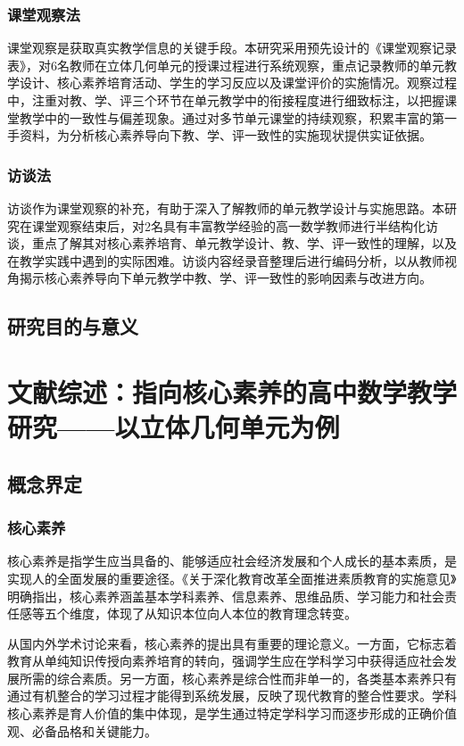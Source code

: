 \documentclass[UTF8,a4paper,12pt,twoside]{ctexart}
\begin{document}
\subsubsection{课堂观察法}
课堂观察是获取真实教学信息的关键手段。本研究采用预先设计的《课堂观察记录表》，对6名教师在立体几何单元的授课过程进行系统观察，重点记录教师的单元教学设计、核心素养培育活动、学生的学习反应以及课堂评价的实施情况。观察过程中，注重对教、学、评三个环节在单元教学中的衔接程度进行细致标注，以把握课堂教学中的一致性与偏差现象。通过对多节单元课堂的持续观察，积累丰富的第一手资料，为分析核心素养导向下教、学、评一致性的实施现状提供实证依据。
\subsubsection{访谈法}
访谈作为课堂观察的补充，有助于深入了解教师的单元教学设计与实施思路。本研究在课堂观察结束后，对2名具有丰富教学经验的高一数学教师进行半结构化访谈，重点了解其对核心素养培育、单元教学设计、教、学、评一致性的理解，以及在教学实践中遇到的实际困难。访谈内容经录音整理后进行编码分析，以从教师视角揭示核心素养导向下单元教学中教、学、评一致性的影响因素与改进方向。

\subsection{研究目的与意义}

\section{文献综述：指向核心素养的高中数学教学研究——以立体几何单元为例}

\subsection{概念界定}

\subsubsection{核心素养}

核心素养是指学生应当具备的、能够适应社会经济发展和个人成长的基本素质，是实现人的全面发展的重要途径。《关于深化教育改革全面推进素质教育的实施意见》明确指出，核心素养涵盖基本学科素养、信息素养、思维品质、学习能力和社会责任感等五个维度，体现了从知识本位向人本位的教育理念转变。

从国内外学术讨论来看，核心素养的提出具有重要的理论意义。一方面，它标志着教育从单纯知识传授向素养培育的转向，强调学生应在学科学习中获得适应社会发展所需的综合素质。另一方面，核心素养是综合性而非单一的，各类基本素养只有通过有机整合的学习过程才能得到系统发展，反映了现代教育的整合性要求。学科核心素养是育人价值的集中体现，是学生通过特定学科学习而逐步形成的正确价值观、必备品格和关键能力。
\end{document}
